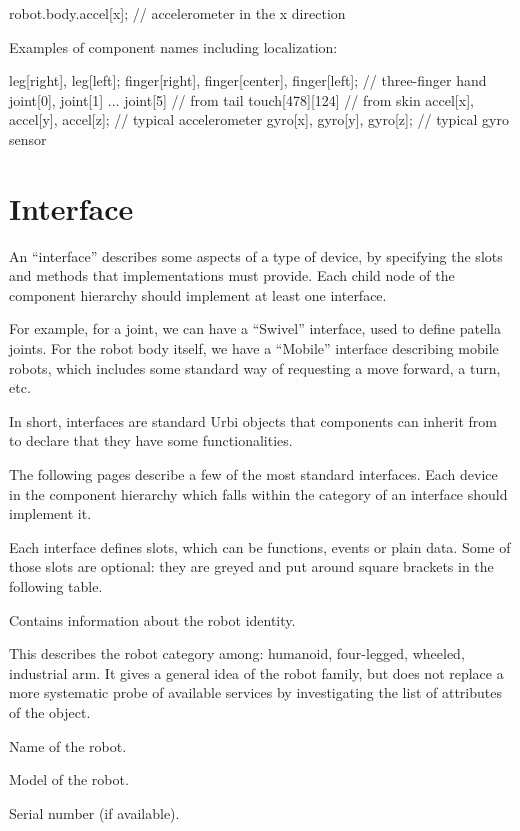 \begin{urbiunchecked}
robot.body.accel[x]; // accelerometer in the x direction
\end{urbiunchecked}


Examples of component names including localization:

\begin{urbiunchecked}
leg[right], leg[left];
finger[right], finger[center], finger[left];      // three-finger hand
joint[0], joint[1] ... joint[5] // from tail
touch[478][124]                 // from skin
accel[x], accel[y], accel[z];         // typical accelerometer
gyro[x], gyro[y], gyro[z];            // typical gyro sensor
\end{urbiunchecked}

\section{Interface}
\label{sec:interface}

An ``interface'' describes some aspects of a type of device, by specifying the
slots and methods that implementations must provide. Each child node of
the component hierarchy should implement at least one interface.

For example, for a joint, we can have a ``Swivel'' interface, used to define
patella joints. For the robot body itself, we have a ``Mobile'' interface
describing mobile robots, which includes some standard way of
requesting a move forward, a turn, etc.

In short, interfaces are standard Urbi objects that components can inherit
from to declare that they have some functionalities.

The following pages describe a few of the most standard interfaces. Each
device in the component hierarchy which falls within the category of an
interface should implement it.

Each interface defines slots, which can be functions, events or plain data.
Some of those slots are optional: they are greyed and put around square
brackets in the following table.


Contains information about the robot identity.

\begin{slots}
  {
    This describes the robot category among: humanoid, four-legged,
    wheeled, industrial arm. It gives a general idea of the robot
    family, but does not replace a more systematic probe of available
    services by investigating the list of attributes of the object.
  }

  {%
    Name of the robot.%
  }

  {%
    Model of the robot.%
  }

  {%
    Serial number (if available).%
  }

\end{slots}


